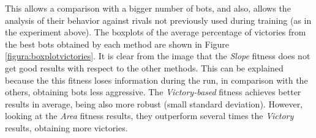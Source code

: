 \documentclass[preprint]{elsarticle}
\begin{document}
This allows a comparison with a bigger number of bots, and also,
allows the analysis of their behavior against rivals not previously
used during training (as in the experiment above). 
The boxplots of the average percentage of victories from the best bots obtained by each method are shown in Figure \ref{figura:boxplotvictories}. It is clear from the image that the \textit{Slope} fitness does not get good results with respect to the other methods. This can be explained because the this fitness loses information during the run, in comparison with the others, obtaining bots less aggressive. 
The \textit{Victory-based} fitness achieves better results in average, being also more robust (small standard deviation). However, looking at the \textit{Area} fitness results, they outperform several times the \textit{Victory} results, obtaining more victories.

\end{document}
